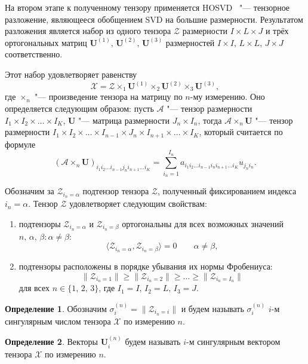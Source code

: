 \documentclass[specialist,
    substylefile = spbu_report.rtx,
    subf,href,colorlinks=true, 12pt]{disser}
\theoremstyle{plain}
\theoremstyle{definition}
\newtheorem{definition}{Определение}[section]
\theoremstyle{remark}
\begin{document}
    На втором этапе к полученному тензору применяется HOSVD~\cite{hosvd} "--- тензорное разложение,
    являющееся обобщением SVD на большие размерности.
    Результатом разложения является набор из одного тензора $\mathcal{Z}$ размерности $I\times L\times J$ и трёх
    ортогональных матриц $\mathbf{U}^{(1)},\, \mathbf{U}^{(2)},\, \mathbf{U}^{(3)}$ размерностей
    $I\times I,\, L\times L,\, J\times J$ соответственно.

    Этот набор удовлетворяет равенству
    \begin{equation}
        \mathcal{X}=\mathcal{Z}\times_1 \mathbf{U}^{(1)}\times_2 \mathbf{U}^{(2)} \times_3 \mathbf{U}^{(3)},\label{eq:trajectory-hosvd}
    \end{equation}
    где $\times_n$ "--- произведение тензора на матрицу по $n$-му измерению.
    Оно определяется следующим образом: пусть $\mathcal A$ "--- тензор размерности
    $I_1\times I_2\times\ldots\times I_K$, $\mathbf U$ "--- матрица размерности $J_n\times I_n$, тогда
    $\mathcal{A}\times_n \mathbf U$ "--- тензор размерности $I_1\times I_2\times\ldots\times I_{n-1}
    \times J_n\times I_{n+1}\times \ldots\times I_K$, который считается по формуле
    \[(\mathcal{A}\times_n \mathbf U)_{i_1 i_2\ldots i_{n-1}j_n i_{n+1}\ldots i_K} = \sum_{i_n=1}^{I_n} a_{i_1 i_2\ldots
    i_{n-1}i_n i_{n+1} \ldots i_K} u_{j_n i_n}.\]

    Обозначим за $\mathcal Z_{i_n=\alpha}$ подтензор тензора $\mathcal Z$, полученный фиксированием индекса $i_n=\alpha$.
    Тензор $\mathcal Z$ удовлетворяет следующим свойствам:
    \begin{enumerate}
        \item подтензоры $\mathcal Z_{i_n=\alpha}$ и $\mathcal Z_{i_n=\beta}$ ортогональны для всех возможных значений
        $n,\, \alpha,\, \beta: \alpha\ne\beta$:
        \[\langle\mathcal Z_{i_n=\alpha},\mathcal Z_{i_n=\beta}\rangle=0 \qquad \alpha\ne\beta,\]
        \item подтензоры расположены в порядке убывания их нормы Фробениуса:
        \[\|\mathcal Z_{i_n=1}\|\geqslant\|\mathcal Z_{i_n=2}\| \geqslant \ldots \geqslant\|\mathcal Z_{i_n=I_n}\|\]
        для всех $n\in \{1,\, 2,\, 3\}$, где $I_1=I,\, I_2=L,\, I_3=J$.
    \end{enumerate}
    \begin{definition}
        \label{def:singular-value}
        Обозначим $\sigma_i^{(n)}=\|\mathcal Z_{i_n=i}\|$ и будем называть $\sigma_i^{(n)}$ $i$-м сингулярным числом
        тензора $\mathcal X$ по измерению $n$.
    \end{definition}
    \begin{definition}
        \label{def:singular-tensor}
        Векторы $\mathbf U_i^{(n)}$ будем называть $i$-м сингулярным вектором тензора $\mathcal X$ по измерению $n$.
    \end{definition}
\end{document}
